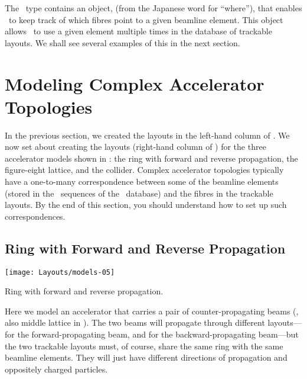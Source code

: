 %
The \PTC\ type  contains an object, 
(from the Japanese word for ``where''), that enables \PTC\ to
keep track of which fibres point to a given beamline element.
This object  allows \PTC\ to use a given element multiple
times in the database of trackable layouts. We shall see several
examples of this in the next section.


\section{Modeling Complex Accelerator Topologies}
\label{sec:model.topos}


%
In the previous section, we created the layouts in the left-hand
column of . We now set about creating the
layouts (right-hand column of ) for the three
accelerator models shown in : the ring with
forward and reverse propagation, the figure-eight lattice, and
the collider. Complex accelerator topologies typically have a
one-to-many correspondence between some of the beamline elements
(stored in the \DNA\ sequences of the \DNA\ database) and the
fibres in the trackable layouts. By the end of this section, you
should understand how to set up such correspondences.


\subsection{Ring with Forward and Reverse Propagation}

\begin{marginfigure}[4\baselineskip] \forceversofloat
  \texttt{[image: Layouts/models-05]}
  \caption{Ring with forward and reverse propagation.}
  \label{fig:fwd.rev.ring}
\end{marginfigure}

%
Here we model an accelerator that carries a pair of
counter-propagating beams (, also middle
lattice in ). The two beams will propagate
through different layouts--- for the forward-propagating
beam, and  for the backward-propagating beam---but
the two trackable layouts must, of course, share the same ring
with the same beamline elements. They will just have different
directions of propagation and oppositely charged particles.


